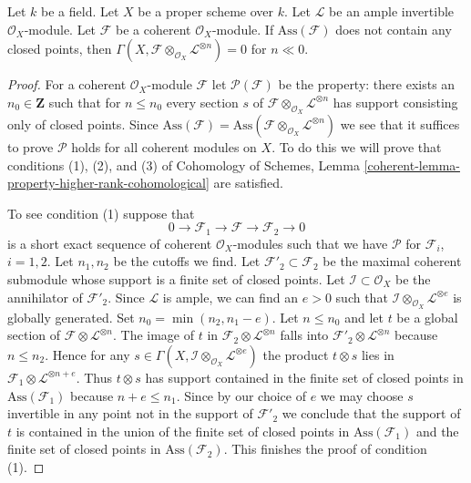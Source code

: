 \begin{lemma}
\label{lemma-vanishin-h0-negative}
Let $k$ be a field. Let $X$ be a proper scheme over $k$. Let $\mathcal{L}$
be an ample invertible $\mathcal{O}_X$-module. Let $\mathcal{F}$ be a
coherent $\mathcal{O}_X$-module. If $\text{Ass}(\mathcal{F})$ does not
contain any closed points, then
$\Gamma(X, \mathcal{F} \otimes_{\mathcal{O}_X} \mathcal{L}^{\otimes n}) = 0$
for $n \ll 0$.
\end{lemma}

\begin{proof}
For a coherent $\mathcal{O}_X$-module $\mathcal{F}$
let $\mathcal{P}(\mathcal{F})$ be the property: there
exists an $n_0 \in \mathbf{Z}$ such that for $n \leq n_0$
every section $s$ of
$\mathcal{F} \otimes_{\mathcal{O}_X} \mathcal{L}^{\otimes n}$
has support consisting only of closed points.
Since $\text{Ass}(\mathcal{F}) =
\text{Ass}(\mathcal{F} \otimes_{\mathcal{O}_X} \mathcal{L}^{\otimes n})$
we see that it suffices to prove $\mathcal{P}$
holds for all coherent modules on $X$.
To do this we will prove that conditions (1), (2), and (3) of
Cohomology of Schemes, Lemma
\ref{coherent-lemma-property-higher-rank-cohomological}
are satisfied.

\medskip\noindent
To see condition (1) suppose that
$$
0 \to \mathcal{F}_1 \to \mathcal{F} \to \mathcal{F}_2 \to 0
$$
is a short exact sequence of coherent $\mathcal{O}_X$-modules
such that we have $\mathcal{P}$ for $\mathcal{F}_i$, $i = 1, 2$.
Let $n_1, n_2$ be the cutoffs we find.
Let $\mathcal{F}'_2 \subset \mathcal{F}_2$ be the maximal
coherent submodule whose support is a finite set of closed
points. Let $\mathcal{I} \subset \mathcal{O}_X$ be the annihilator
of $\mathcal{F}'_2$. Since $\mathcal{L}$ is ample, we can find an $e > 0$
such that $\mathcal{I} \otimes_{\mathcal{O}_X} \mathcal{L}^{\otimes e}$
is globally generated. Set $n_0 = \min(n_2, n_1 - e)$. Let $n \leq n_0$
and let $t$ be a global section of
$\mathcal{F} \otimes \mathcal{L}^{\otimes n}$.
The image of $t$ in $\mathcal{F}_2 \otimes \mathcal{L}^{\otimes n}$
falls into $\mathcal{F}'_2 \otimes \mathcal{L}^{\otimes n}$ because
$n \leq n_2$. Hence for any
$s \in \Gamma(X, \mathcal{I} \otimes_{\mathcal{O}_X} \mathcal{L}^{\otimes e})$
the product $t \otimes s$ lies in
$\mathcal{F}_1 \otimes \mathcal{L}^{\otimes n + e}$.
Thus $t \otimes s$ has support contained in
the finite set of closed points in $\text{Ass}(\mathcal{F}_1)$
because $n + e \leq n_1$. Since by our choice of $e$
we may choose $s$ invertible in any point
not in the support of $\mathcal{F}'_2$
we conclude that the support of $t$ is contained in the union of the 
finite set of closed points in $\text{Ass}(\mathcal{F}_1)$ and
the finite set of closed points in $\text{Ass}(\mathcal{F}_2)$.
This finishes the proof of condition (1).


\end{proof}
